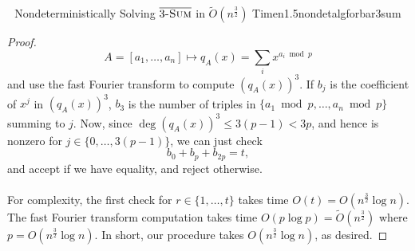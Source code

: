 \begin{theorem}{\Stop\,\,\cite{carmosino2016nseth} Nondeterministically Solving \(\bar{3\textsc{-Sum}}\) in \(\tilde{O}(n^{\frac{3}{2}})\) Time}{n1.5nondetalgforbar3sum}
\begin{proof}
                \begin{equation*}
                    A=[a_1,\ldots,a_n]\mapsto q_A(x)=\sum_{i}x^{a_i\bmod p}
                \end{equation*}
                and use the fast Fourier transform to compute \((q_A(x))^3\). If \(b_j\) is the coefficient of \(x^j\) in \((q_A(x))^3\), \(b_3\) is the number of triples in \(\{a_1\bmod p,\ldots,a_n\bmod p\}\) summing to \(j\). Now, since \(\deg (q_A(x))^3\leq 3(p-1)<3p\), and hence is nonzero for \(j\in\{0,\ldots,3(p-1)\}\), we can just check
                \begin{equation*}
                    b_0+b_{p}+b_{2p}=t,
                \end{equation*}
                and accept if we have equality, and reject otherwise.
                \\
                \\
                For complexity, the first check for \(r\in\{1,\ldots,t\}\) takes time \(O(t)=O\left(n^{\frac{3}{2}}\log n\right)\). The fast Fourier transform computation takes time \(O(p\log p)=\tilde{O}\left(n^\frac{3}{2}\right)\) where \(p=O\left(n^{\frac{3}{2}}\log n\right)\). In short, our procedure takes \(O\left(n^{\frac{3}{2}}\log n\right)\), as desired.
            \end{proof}
        \end{theorem}